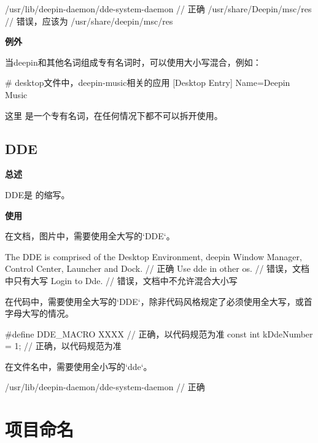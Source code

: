 \begin{cppcode}
  /usr/lib/deepin-daemon/dde-system-daemon  // 正确
  /usr/share/Deepin/msc/res  // 错误，应该为 /usr/share/deepin/msc/res
\end{cppcode}

\textbf{例外}

当deepin和其他名词组成专有名词时，可以使用大小写混合，例如：

\begin{inicode}
  # desktop文件中，deepin-music相关的应用
  [Desktop Entry]
  Name=Deepin Music
\end{inicode}

这里 是一个专有名词，在任何情况下都不可以拆开使用。

\subsection{DDE}

\textbf{总述}

DDE是  的缩写。


\textbf{使用}

在文档，图片中，需要使用全大写的`DDE`。

\begin{cppcode}
  The DDE is comprised of the Desktop Environment, deepin Window Manager, Control Center, Launcher and Dock.    // 正确
  Use dde in other os.                  // 错误，文档中只有大写
  Login to Dde.                         // 错误，文档中不允许混合大小写
\end{cppcode}

在代码中，需要使用全大写的`DDE`，除非代码风格规定了必须使用全大写，或首字母大写的情况。

\begin{cppcode}
  #define DDE_MACRO XXXX     // 正确，以代码规范为准
  const int kDdeNumber = 1;  // 正确，以代码规范为准
\end{cppcode}

在文件名中，需要使用全小写的`dde`。

\begin{cppcode}
  /usr/lib/deepin-daemon/dde-system-daemon  // 正确
\end{cppcode}

\section{项目命名} \label{deepin-project-naming}

